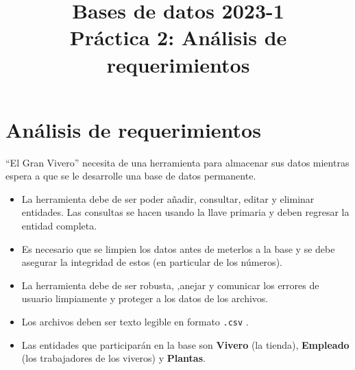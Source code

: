 \documentclass[12pt,a4paper]{article}
\title{Bases de datos 2023-1\\
Práctica 2: Análisis de requerimientos}
\begin{document}
\maketitle

\section{Análisis de requerimientos}
``El Gran Vivero'' necesita de una herramienta para almacenar sus datos
mientras espera a que se le desarrolle una base de datos permanente.\\

\begin{itemize}
	\item La herramienta debe de ser poder añadir, consultar, editar y eliminar
		entidades. Las consultas se hacen usando la llave primaria y deben
		regresar la entidad completa.\\

	\item Es necesario que se limpien los datos antes de meterlos a la base y
		se debe asegurar la integridad de estos (en particular de los números).\\

	\item La herramienta debe de ser robusta, ,anejar y comunicar los errores
		de usuario limpiamente y proteger a los datos de los archivos.\\

	\item Los archivos deben ser texto legible en formato \texttt{.csv} .\\

	\item Las entidades que participarán en la base son \textbf{Vivero} (la tienda),
		\textbf{Empleado} (los trabajadores de los viveros) y \textbf{Plantas}.\\


\end{itemize}
\end{document}
